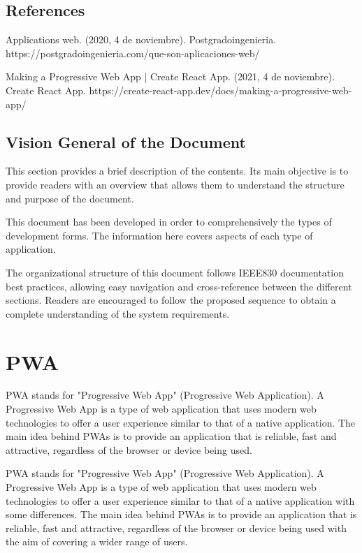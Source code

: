 \documentclass[12pt,a4paper, twosite]{article}
\begin{document}
	\subsection{References}
	\label{sec:references}
	
	Applications web. (2020, 4 de noviembre). Postgradoingenieria. https://postgradoingenieria.com/que-son-aplicaciones-web/
	
	Making a Progressive Web App | Create React App. (2021, 4 de noviembre). Create React App. https://create-react-app.dev/docs/making-a-progressive-web-app/
	
	\subsection{Vision General of the Document}
	\label{sec:overview}
	
	This section provides a brief description of the contents. Its main objective is to provide readers with an overview that allows them to understand the structure and purpose of the document.
	
	This document has been developed in order to comprehensively the types of development forms. The information here covers aspects of each type of application.
	
	The organizational structure of this document follows IEEE830 documentation best practices, allowing easy navigation and cross-reference between the different sections. Readers are encouraged to follow the proposed sequence to obtain a complete understanding of the system requirements.
		
	\section{PWA}
	\label{sec:system-description}
	PWA stands for "Progressive Web App" (Progressive Web Application). A Progressive Web App is a type of web application that uses modern web technologies to offer a user experience similar to that of a native application. The main idea behind PWAs is to provide an application that is reliable, fast and attractive, regardless of the browser or device being used.
	
	PWA stands for "Progressive Web App" (Progressive Web Application). A Progressive Web App is a type of web application that uses modern web technologies to offer a user experience similar to that of a native application with some differences. The main idea behind PWAs is to provide an application that is reliable, fast and attractive, regardless of the browser or device being used with the aim of covering a wider range of users.
\end{document}
